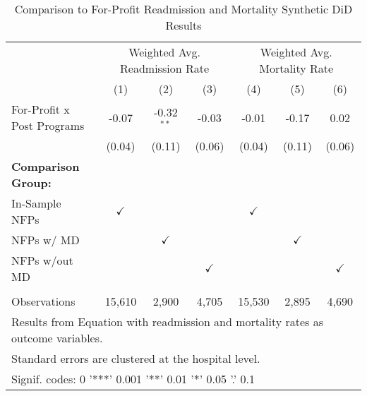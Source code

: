 \begin{table}[ht!]

\caption{\label{tab:forprofit_readmort_synth}Comparison to For-Profit Readmission and Mortality Synthetic DiD Results}
\centering
\begin{tabular}[t]{lcccccc}
\toprule
\multicolumn{1}{c}{ } & \multicolumn{3}{c}{Weighted Avg. Readmission Rate} & \multicolumn{3}{c}{Weighted Avg. Mortality Rate} \\
 & (1) & (2) & (3) & (4) & (5) & (6)\\
\midrule
For-Profit x Post Programs & -0.07 & -0.32$^{**}$ & -0.03 & -0.01 & -0.17 & 0.02\\
 & (0.04) & (0.11) & (0.06) & (0.04) & (0.11) & (0.06)\\
\textbf{Comparison Group:} &  &  &  &  &  & \\
In-Sample NFPs & $\checkmark$ &  &  & $\checkmark$ &  & \\
NFPs w/ MD &  & $\checkmark$ &  &  & $\checkmark$ & \\
\addlinespace
NFPs w/out MD &  &  & $\checkmark$ &  &  & $\checkmark$\\
 &  &  &  &  &  & \\
Observations & 15,610 & 2,900 & 4,705 & 15,530 & 2,895 & 4,690\\
\bottomrule
\multicolumn{7}{l}{\textsuperscript{} Results from Equation with readmission and mortality rates as outcome variables.}\\
\multicolumn{7}{l}{\textsuperscript{} Standard errors are clustered at the hospital level.}\\
\multicolumn{7}{l}{\textsuperscript{} Signif. codes: 0 '***' 0.001 '**' 0.01 '*' 0.05 '.' 0.1}\\
\end{tabular}
\end{table}
